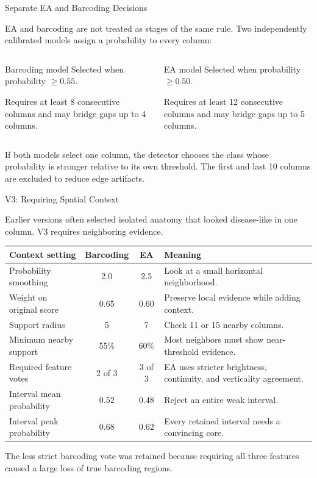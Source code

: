 \documentclass[aspectratio=169]{beamer}
\begin{document}
\begin{frame}{Separate EA and Barcoding Decisions}

EA and barcoding are not treated as stages of the same rule. Two independently
calibrated models assign a probability to every column:

\begin{columns}[T]
\begin{block}{Barcoding model}
Selected when probability $\geq 0.55$.

Requires at least 8 consecutive columns and may bridge gaps up to 4 columns.
\end{block}

\begin{block}{EA model}
Selected when probability $\geq 0.50$.

Requires at least 12 consecutive columns and may bridge gaps up to 5 columns.
\end{block}
\end{columns}

\vspace{0.35cm}

If both models select one column, the detector chooses the class whose
probability is stronger relative to its own threshold. The first and last 10
columns are excluded to reduce edge artifacts.

\end{frame}

\begin{frame}{V3: Requiring Spatial Context}

Earlier versions often selected isolated anatomy that looked disease-like in
one column. V3 requires neighboring evidence.

\scriptsize
\begin{table}
\centering
\begin{tabular}{lccp{}}
\toprule
Context setting & Barcoding & EA & Meaning \\
\midrule
Probability smoothing & 2.0 & 2.5 & Look at a small horizontal neighborhood. \\
Weight on original score & 0.65 & 0.60 & Preserve local evidence while adding context. \\
Support radius & 5 & 7 & Check 11 or 15 nearby columns. \\
Minimum nearby support & 55\% & 60\% & Most neighbors must show near-threshold evidence. \\
Required feature votes & 2 of 3 & 3 of 3 & EA uses stricter brightness, continuity, and verticality agreement. \\
Interval mean probability & 0.52 & 0.48 & Reject an entire weak interval. \\
Interval peak probability & 0.68 & 0.62 & Every retained interval needs a convincing core. \\
\bottomrule
\end{tabular}
\end{table}

The less strict barcoding vote was retained because requiring all three
features caused a large loss of true barcoding regions.

\end{frame}
\end{document}
